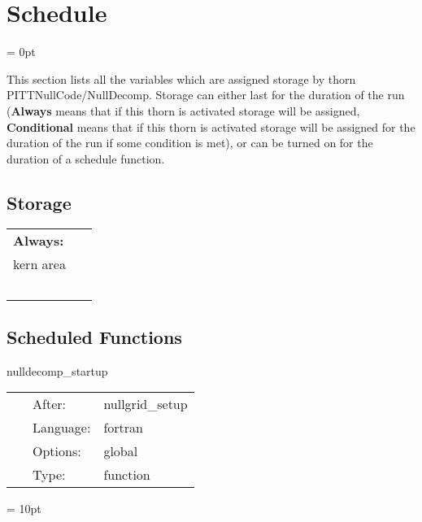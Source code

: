 
\section{Schedule} 


\parskip = 0pt


\noindent This section lists all the variables which are assigned storage by thorn PITTNullCode/NullDecomp.  Storage can either last for the duration of the run ({\bf Always} means that if this thorn is activated storage will be assigned, {\bf Conditional} means that if this thorn is activated storage will be assigned for the duration of the run if some condition is met), or can be turned on for the duration of a schedule function.


\subsection*{Storage}

\hspace{5mm}

 \begin{tabular*}{160mm}{ll} 

{\bf Always:}&  ~ \\ 
 kern area & ~\\ 
~ & ~\\ 
\end{tabular*} 


\subsection*{Scheduled Functions}
\vspace{5mm}


\hspace{5mm} nulldecomp\_startup 

\hspace{5mm}{\it initialization } 


\hspace{5mm}

 \begin{tabular*}{160mm}{cll} 
~ & After:  & nullgrid\_setup \\ 
~ & Language:  & fortran \\ 
~ & Options:  & global \\ 
~ & Type:  & function \\ 
\end{tabular*} 



\vspace{5mm}\parskip = 10pt 
